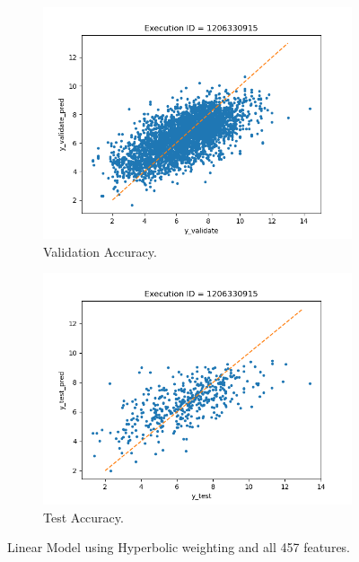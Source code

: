 \documentclass[11pt]{article}
\begin{document}

\begin{figure}
     \centering
     \begin{subfigure}[b]{0.45\textwidth}
         \centering
         \includegraphics[scale=0.45]{images/accuracyValidateLGHyperbolic}
         \caption{Validation Accuracy.}
        \label{fig:accuracyValidateLGHyperbolic}
     \end{subfigure}
     \hfill
     \begin{subfigure}[b]{0.45\textwidth}
         \centering
         \includegraphics[scale=0.45]{images/accuracytestLGHyperbolic}
        \caption{Test Accuracy.}
        \label{fig:accuracytestLGHyperbolic}
     \end{subfigure}
     \caption{Linear Model using Hyperbolic weighting and all 457 features.}
     \label{fig:BestLinearModel}
\end{figure}
\end{document}
